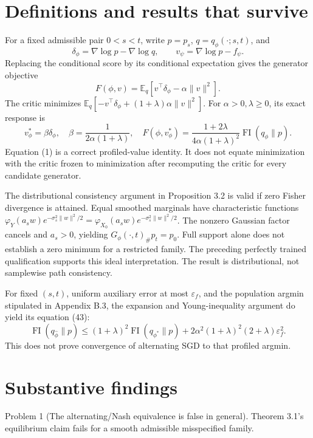 \documentclass[10pt]{article}
\begin{document}
\section*{Definitions and results that survive}
For a fixed admissible pair \(0<s<t\), write \(p=p_s\), \(q=q_\phi(\cdot;s,t)\), and \[\delta_\phi=\nabla\log p-\nabla\log q,\qquad
 v_\psi=\nabla\log p-f_\psi.\] Replacing the conditional score by its conditional expectation gives the generator objective \[F(\phi,v)=\mathbb E_q[v^\top\delta_\phi-\alpha\|v\|^2].\] The critic minimizes \(\mathbb E_q[-v^\top\delta_\phi+(1+\lambda)\alpha\|v\|^2]\). For \(\alpha>0,\lambda\geq0\), its exact response is \[v_\phi^*=\beta\delta_\phi,\quad
 \beta=\frac{1}{2\alpha(1+\lambda)},\quad
 F(\phi,v_\phi^*)=
 \frac{1+2\lambda}{4\alpha(1+\lambda)^2}
 \operatorname{FI}(q_\phi\|p).                         \tag{1}\] Equation (1) is a correct profiled-value identity. It does not equate minimization with the critic frozen to minimization after recomputing the critic for every candidate generator.\par
The distributional consistency argument in Proposition 3.2 is valid if zero Fisher divergence is attained. Equal smoothed marginals have characteristic functions \(\varphi_Y(a_sw)e^{-\sigma_s^2\|w\|^2/2}
=\varphi_{X_0}(a_sw)e^{-\sigma_s^2\|w\|^2/2}\). The nonzero Gaussian factor cancels and \(a_s>0\), yielding \(G_\phi(\cdot,t)_\#p_t=p_0\). Full support alone does not establish a zero minimum for a restricted family. The preceding perfectly trained qualification supports this ideal interpretation. The result is distributional, not samplewise path consistency.\par
For fixed \((s,t)\), uniform auxiliary error at most \(\varepsilon_f\), and the population argmin stipulated in Appendix B.3, the expansion and Young-inequality argument do yield its equation (43): \[\operatorname{FI}(q_{\hat\phi}\|p)
 \leq(1+\lambda)^2\operatorname{FI}(q_{\phi^*}\|p)
 +2\alpha^2(1+\lambda)^2(2+\lambda)\varepsilon_f^2.\] This does not prove convergence of alternating SGD to that profiled argmin.\par
\section*{Substantive findings}
Problem 1 (The alternating/Nash equivalence is false in general).  Theorem 3.1’s equilibrium claim fails for a smooth admissible misspecified family.\par
\end{document}
